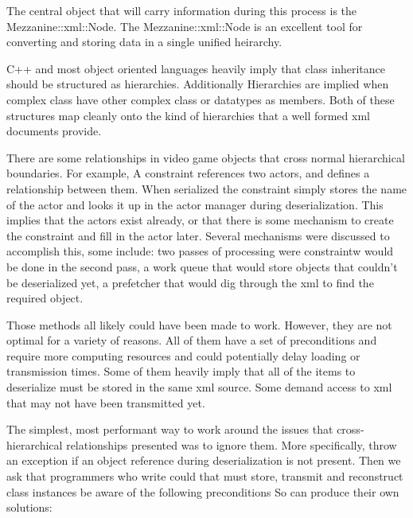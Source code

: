 The central object that will carry information during this process is the Mezzanine::xml::Node. The Mezzanine::xml::Node is an excellent tool for converting and storing data in a single unified heirarchy. \par
 \par
 C++ and most object oriented languages heavily imply that class inheritance should be structured as hierarchies. Additionally Hierarchies are implied when complex class have other complex class or datatypes as members. Both of these structures map cleanly onto the kind of hierarchies that a well formed xml documents provide. \par
 \par
 There are some relationships in video game objects that cross normal hierarchical boundaries. For example, A constraint references two actors, and defines a relationship between them. When serialized the constraint simply stores the name of the actor and looks it up in the actor manager during deserialization. This implies that the actors exist already, or that there is some mechanism to create the constraint and fill in the actor later. Several mechanisms were discussed to accomplish this, some include: two passes of processing were constraintw would be done in the second pass, a work queue that would store objects that couldn't be deserialized yet, a prefetcher that would dig through the xml to find the required object. \par
 \par
 Those methods all likely could have been made to work. However, they are not optimal for a variety of reasons. All of them have a set of preconditions and require more computing resources and could potentially delay loading or transmission times. Some of them heavily imply that all of the items to deserialize must be stored in the same xml source. Some demand access to xml that may not have been transmitted yet. \par
 \par
 The simplest, most performant way to work around the issues that cross-\/hierarchical relationships presented was to ignore them. More specifically, throw an exception if an object reference during deserialization is not present. Then we ask that programmers who write could that must store, transmit and reconstruct class instances be aware of the following preconditions So can produce their own solutions:
